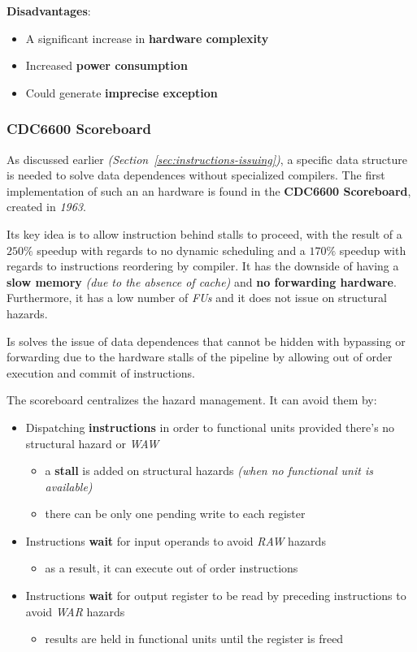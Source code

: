 \documentclass[english]{article}
\begin{document}
\textbf{Disadvantages}:
\begin{itemize}
  \item A significant increase in \textbf{hardware complexity}
  \item Increased \textbf{power consumption}
  \item Could generate \textbf{imprecise exception}
\end{itemize}

\subsubsection{CDC6600 Scoreboard}
\label{par:CDC6600-scoreboard}

As discussed earlier \textit{(Section~\ref{sec:instructions-issuing})}, a specific data structure is needed to solve data dependences without specialized compilers.
The first implementation of such an an hardware is found in the \textbf{CDC6600 Scoreboard}, created in \textit{1963}.

Its key idea is to allow instruction behind stalls to proceed, with the result of a \(250\%\) speedup with regards to no dynamic scheduling and a \(170\%\) speedup with regards to instructions reordering by compiler.
It has the downside of having a \textbf{slow memory} \textit{(due to the absence of cache)} and \textbf{no forwarding hardware}.
Furthermore, it has a low number of \textit{FUs} and it does not issue on structural hazards.

Is solves the issue of data dependences that cannot be hidden with bypassing or forwarding due to the hardware stalls of the pipeline by allowing out of order execution and commit of instructions.

\bigskip
The scoreboard centralizes the hazard management.
It can avoid them by:

\begin{itemize}
  \item Dispatching \textbf{instructions} in order to functional units provided there's no structural hazard or \textit{WAW}
        \begin{itemize}
          \item a \textbf{stall} is added on structural hazards \textit{(when no functional unit is available)}
          \item there can be only one pending write to each register
        \end{itemize}
  \item Instructions \textbf{wait} for input operands to avoid \textit{RAW} hazards
        \begin{itemize}
          \item as a result, it can execute out of order instructions
        \end{itemize}
  \item Instructions \textbf{wait} for output register to be read by preceding instructions to avoid \textit{WAR} hazards
        \begin{itemize}
          \item results are held in functional units until the register is freed
        \end{itemize}
\end{itemize}
\end{document}
